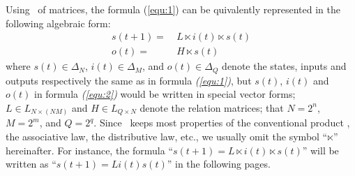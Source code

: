 Using \STP\ of matrices, the formula (\ref{equ:1}) can be quivalently represented in the following algebraic form:
\begin{equation}
\begin{split}
s(t+1)=&\ L\ltimes{i(t)}\ltimes{s(t)}\\
o(t)=&\ H\ltimes{s(t)}
\end{split}
\label{equ:2}
\end{equation}
where $s(t)\in\Delta_N$, $i(t)\in\Delta_M$, and  $o(t)\in\Delta_Q$ denote the states, inputs and outputs respectively the same as in formula {\em (\ref{equ:1})}, but $s(t)$, $i(t)$ and $o(t)$ in formula {\em (\ref{equ:2})} would be written in special vector forms; $L\in L_{N\times\left(NM\right)}$ and $H\in L_{Q\times N}$ denote the relation matrices; that $N=2^n$, $M=2^m$, and $Q=2^q$. Since \STP\ keeps most properties of the conventional product \cite{Cheng2011Analysis}, the associative law, the distributive law, etc., we usually omit the symbol ``$\ltimes$'' hereinafter. For instance, the 
formula ``$s(t+1)=L\ltimes{i(t)}\ltimes{s(t)}$'' will be written as ``$s(t+1)=L{i(t)}{s(t)}$'' in the following pages.


